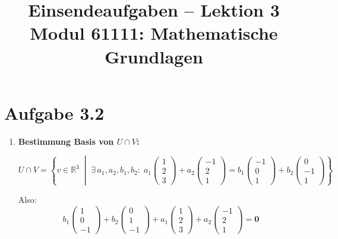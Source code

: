 \documentclass[a4paper,12pt]{article}
\title{Einsendeaufgaben -- Lektion 3\\[0.5em]
\large Modul 61111: Mathematische Grundlagen}
\author{}
\date{}
\begin{document}
\maketitle

\section*{Aufgabe 3.2}

\begin{enumerate}[label=\alph*)]

    \item \textbf{Bestimmung Basis von $U \cap V$:}

    \[
        U \cap V = \left\{ v \in \mathbb{R}^3 \;\middle|\;
        \exists\, a_1, a_2, b_1, b_2 :\;
        a_1 \begin{pmatrix}1\\2\\3\end{pmatrix}
        + a_2 \begin{pmatrix}-1\\2\\1\end{pmatrix}
        = b_1 \begin{pmatrix}-1\\0\\1\end{pmatrix}
        + b_2 \begin{pmatrix}0\\-1\\1\end{pmatrix}
        \right\}
    \]

    Also:
    \[
        b_1 \begin{pmatrix}1\\0\\-1\end{pmatrix}
        + b_2 \begin{pmatrix}0\\1\\-1\end{pmatrix}
        + a_1 \begin{pmatrix}1\\2\\3\end{pmatrix}
        + a_2 \begin{pmatrix}-1\\2\\1\end{pmatrix}
        = \mathbf{0}
    \]


\end{enumerate}
\end{document}
